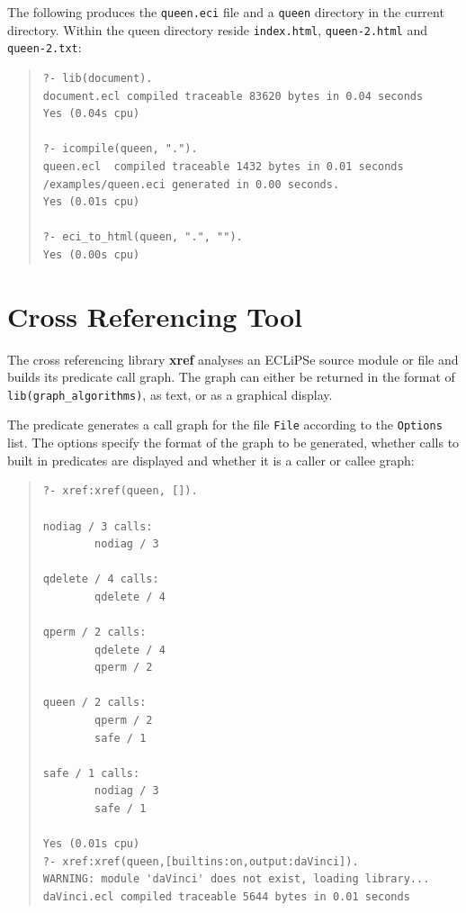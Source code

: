 The following produces the {\tt queen.eci} file and a {\tt queen}
directory in the current directory. Within the queen directory reside
{\tt index.html}, {\tt queen-2.html} and {\tt queen-2.txt}:
\begin{quote}
\begin{verbatim}
?- lib(document).
document.ecl compiled traceable 83620 bytes in 0.04 seconds
Yes (0.04s cpu)

?- icompile(queen, ".").
queen.ecl  compiled traceable 1432 bytes in 0.01 seconds
/examples/queen.eci generated in 0.00 seconds.
Yes (0.01s cpu)

?- eci_to_html(queen, ".", "").
Yes (0.00s cpu)
\end{verbatim}
\end{quote}

\section{Cross Referencing Tool}

The cross referencing library {\bf xref} analyses an ECLiPSe source 
module or file and builds its predicate call graph. The graph can either 
be returned in the format of {\tt lib(graph_algorithms)}, as text, or
as a graphical display.

The  predicate generates
a call graph for the file {\tt File} according to the {\tt Options} 
list.  The options specify the format of the graph to be generated, whether
calls to built in predicates are displayed and whether it is a caller
or callee graph:
\begin{quote}
\begin{verbatim}
?- xref:xref(queen, []).
 
nodiag / 3 calls:
        nodiag / 3
 
qdelete / 4 calls:
        qdelete / 4
 
qperm / 2 calls:
        qdelete / 4
        qperm / 2
 
queen / 2 calls:
        qperm / 2
        safe / 1
 
safe / 1 calls:
        nodiag / 3
        safe / 1
 
Yes (0.01s cpu)
?- xref:xref(queen,[builtins:on,output:daVinci]).
WARNING: module 'daVinci' does not exist, loading library...
daVinci.ecl compiled traceable 5644 bytes in 0.01 seconds
\end{verbatim}
\end{quote}

